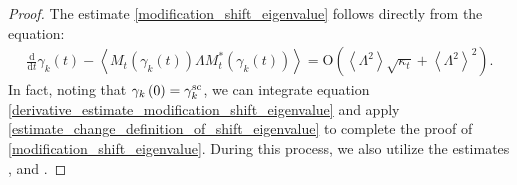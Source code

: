 \documentclass[10pt,reqno]{amsart}
\numberwithin{equation}{section}
\numberwithin{figure}{section}
\theoremstyle{plain} %
\theoremstyle{definition} %
\renewcommand{\txt}[1]{\text{\rm{#1}}}
\newcommand{\p}[1]{({#1})}
\newcommand{\pa}[1]{\left({#1}\right)}
\newcommand{\avga}[1]{\left\langle #1 \right\rangle}
\newcommand{\rd}{\mathrm{d}}
\newcommand{\OO}{\mathrm{O}}
\numberwithin{equation}{section}
\begin{document}
\begin{proof}
The estimate \eqref{modification_shift_eigenvalue} follows directly from the equation:
\begin{equation}\label{derivative_estimate_modification_shift_eigenvalue}
        \begin{aligned}
            \frac{\rd}{\rd t} \gamma_k\p{t}-\avga{M_t\p{\gamma_k(t)}\Lambda M_t^{*}\p{\gamma_k(t)}}=\OO\pa{\avga{\Lambda^2}\sqrt{\kappa_t}+\avga{\Lambda^2}^2}.
        \end{aligned}
    \end{equation}
In fact, noting that $\gamma_k\pa{0}=\gamma_k^{\txt{sc}}$, we can integrate equation \eqref{derivative_estimate_modification_shift_eigenvalue} and apply \eqref{estimate_change_definition_of_shift_eigenvalue} to complete the proof of \eqref{modification_shift_eigenvalue}. 
During this process, we also utilize the estimates , and \smash{$\avga{\Lambda^2}\lesssim N^{-1/3-2\varepsilon_A}k^{-2/3}$}.




\end{proof}
\end{document}
